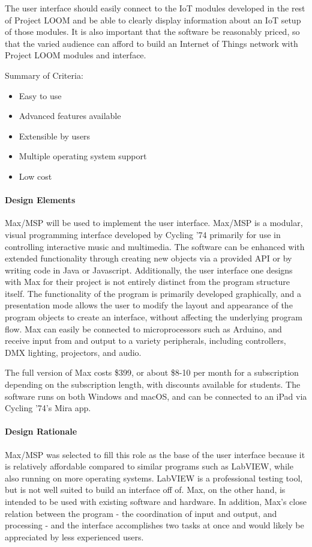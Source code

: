 \documentclass[onecolumn, draftclsnofoot,10pt, compsoc]{IEEEtran}
\begin{document}
    The user interface should easily connect to the IoT modules developed in the rest of Project LOOM and be able to clearly display information about an IoT setup of those modules. It is also important that the software be reasonably priced, so that the varied audience can afford to build an Internet of Things network with Project LOOM modules and interface.

    Summary of Criteria:
    \begin{itemize}[noitemsep,topsep=-10pt]
        \item Easy to use
        \item Advanced features available
        \item Extensible by users
        \item Multiple operating system support
        \item Low cost
    \end{itemize}

\paragraph{Design Elements}
    Max/MSP will be used to implement the user interface. Max/MSP is a modular, visual programming interface developed by Cycling '74 primarily for use in controlling interactive music and multimedia. The software can be enhanced with extended functionality through creating new objects via a provided API or by writing code in Java or Javascript. Additionally, the user interface one designs with Max for their project is not entirely distinct from the program structure itself. The functionality of the program is primarily developed graphically, and a presentation mode allows the user to modify the layout and appearance of the program objects to create an interface, without affecting the underlying program flow. Max can easily be connected to microprocessors such as Arduino, and receive input from and output to a variety peripherals, including controllers, DMX lighting, projectors, and audio. \cite{max}

    The full version of Max costs \$399, or about \$8-10 per month for a subscription depending on the subscription length, with discounts available for students. The software runs on both Windows and macOS, and can be connected to an iPad via Cycling '74's Mira app. \cite{buymax}

\paragraph{Design Rationale}
    Max/MSP was selected to fill this role as the base of the user interface because it is relatively affordable compared to similar programs such as LabVIEW, while also running on more operating systems. LabVIEW is a professional testing tool, but is not well suited to build an interface off of. Max, on the other hand, is intended to be used with existing software and hardware. In addition, Max's close relation between the program - the coordination of input and output, and processing - and the interface accomplishes two tasks at once and would likely be appreciated by less experienced users.
\end{document}
